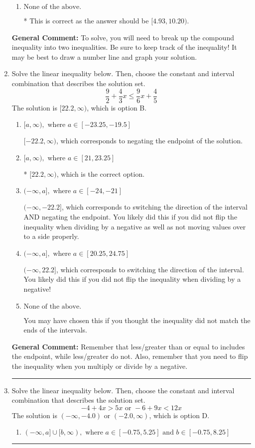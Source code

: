 \documentclass{extbook}[14pt]
\newcommand{\litem}[1]{\item #1

\rule{\textwidth}{0.4pt}}
\begin{document}
\begin{enumerate}
{\begin{enumerate}[label=\Alph*.]
$[-4.93, -10.20)$, which is the correct interval but negatives of the actual endpoints.
\item \( \text{None of the above.} \)

* This is correct as the answer should be $[4.93, 10.20)$.
\end{enumerate}

\textbf{General Comment:} To solve, you will need to break up the compound inequality into two inequalities. Be sure to keep track of the inequality! It may be best to draw a number line and graph your solution.
}
\litem{
Solve the linear inequality below. Then, choose the constant and interval combination that describes the solution set.
\[ \frac{9}{2} + \frac{4}{3} x \leq \frac{9}{6} x + \frac{4}{5} \]The solution is \( [22.2, \infty) \), which is option B.\begin{enumerate}[label=\Alph*.]
\item \( [a, \infty), \text{ where } a \in [-23.25, -19.5] \)

 $[-22.2, \infty)$, which corresponds to negating the endpoint of the solution.
\item \( [a, \infty), \text{ where } a \in [21, 23.25] \)

* $[22.2, \infty)$, which is the correct option.
\item \( (-\infty, a], \text{ where } a \in [-24, -21] \)

 $(-\infty, -22.2]$, which corresponds to switching the direction of the interval AND negating the endpoint. You likely did this if you did not flip the inequality when dividing by a negative as well as not moving values over to a side properly.
\item \( (-\infty, a], \text{ where } a \in [20.25, 24.75] \)

 $(-\infty, 22.2]$, which corresponds to switching the direction of the interval. You likely did this if you did not flip the inequality when dividing by a negative!
\item \( \text{None of the above}. \)

You may have chosen this if you thought the inequality did not match the ends of the intervals.
\end{enumerate}

\textbf{General Comment:} Remember that less/greater than or equal to includes the endpoint, while less/greater do not. Also, remember that you need to flip the inequality when you multiply or divide by a negative.
}
\litem{
Solve the linear inequality below. Then, choose the constant and interval combination that describes the solution set.
\[ -4 + 4 x > 5 x \text{ or } -6 + 9 x < 12 x \]The solution is \( (-\infty, -4.0) \text{ or } (-2.0, \infty) \), which is option D.\begin{enumerate}[label=\Alph*.]
\item \( (-\infty, a] \cup [b, \infty), \text{ where } a \in [-0.75, 5.25] \text{ and } b \in [-0.75, 8.25] \)


\end{enumerate}}
\end{enumerate}
\end{document}

